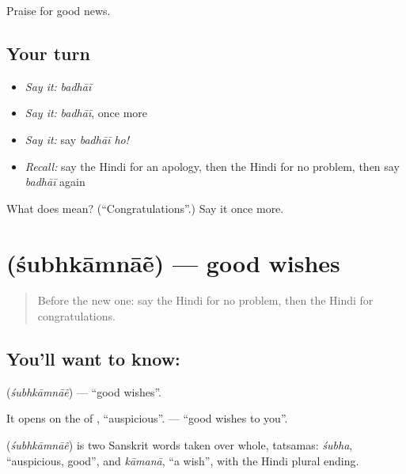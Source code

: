 \begin{grammarlens}[title={What you've built}]
Praise for good news.
\end{grammarlens}

\subsection*{Your turn}
\begin{itemize}
\raggedright
  \item \emph{Say it:} \emph{badhāī}
  \item \emph{Say it:} \emph{badhāī}, once more
  \item \emph{Say it:} say \emph{badhāī ho!}
  \item \emph{Recall:} say the Hindi for an apology, then the Hindi for no problem, then say \emph{badhāī} again
\end{itemize}

\begin{tcolorbox}[breakable,colback=teal!4,colframe=teal!35!black,title={Before you move on}]
What does  mean? (\textquotedblleft{}Congratulations\textquotedblright{}.) Say it once more.
\end{tcolorbox}
\section[\texorpdfstring{\hi{शुभकामनाएँ} (śubhkāmnāẽ)}{शुभकामनाएँ (śubhkāmnāẽ)}]{ (śubhkāmnāẽ) — good wishes}

\label{lesson:HI-C114-shubhkamnaen}



\begin{quote}
Before the new one: say the Hindi for no problem, then the Hindi for congratulations.
\end{quote}

\subsection*{You'll want to know: }
\textbf{} (\emph{śubhkāmnāẽ}) — \textquotedblleft{}good wishes\textquotedblright{}.

It opens on the \textbf{} of \textbf{ }, \textquotedblleft{}auspicious\textquotedblright{}. \textbf{ } — \textquotedblleft{}good wishes to you\textquotedblright{}.

\begin{cousinweb}
\textbf{} (\emph{śubhkāmnāẽ}) is two Sanskrit words taken over whole, tatsamas: \emph{śubha}, \textquotedblleft{}auspicious, good\textquotedblright{}, and \emph{kāmanā}, \textquotedblleft{}a wish\textquotedblright{}, with the Hindi plural ending.
\end{cousinweb}

